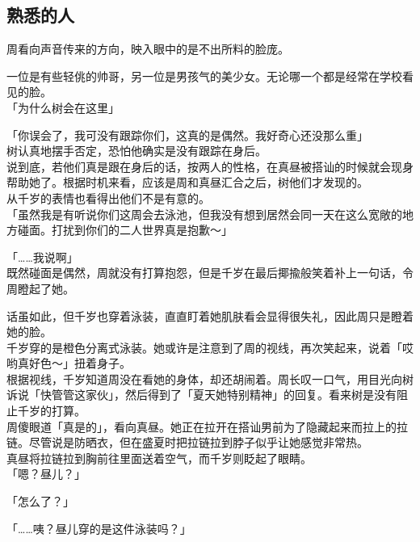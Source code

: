 \subsection{熟悉的人}

周看向声音传来的方向，映入眼中的是不出所料的脸庞。

一位是有些轻佻的帅哥，另一位是男孩气的美少女。无论哪一个都是经常在学校看见的脸。\\

「为什么树会在这里」

「你误会了，我可没有跟踪你们，这真的是偶然。我好奇心还没那么重」\\

树认真地摆手否定，恐怕他确实是没有跟踪在身后。\\

说到底，若他们真是跟在身后的话，按两人的性格，在真昼被搭讪的时候就会现身帮助她了。根据时机来看，应该是周和真昼汇合之后，树他们才发现的。\\

从千岁的表情也看得出他们不是有意的。\\

「虽然我是有听说你们这周会去泳池，但我没有想到居然会同一天在这么宽敞的地方碰面。打扰到你们的二人世界真是抱歉～」

「……我说啊」\\

既然碰面是偶然，周就没有打算抱怨，但是千岁在最后揶揄般笑着补上一句话，令周瞪起了她。

话虽如此，但千岁也穿着泳装，直直盯着她肌肤看会显得很失礼，因此周只是瞪着她的脸。\\

千岁穿的是橙色分离式泳装。她或许是注意到了周的视线，再次笑起来，说着「哎哟真好色～」扭着身子。\\

根据视线，千岁知道周没在看她的身体，却还胡闹着。周长叹一口气，用目光向树诉说「快管管这家伙」，然后得到了「夏天她特别精神」的回复。看来树是没有阻止千岁的打算。\\

周傻眼道「真是的」，看向真昼。她正在拉开在搭讪男前为了隐藏起来而拉上的拉链。尽管说是防晒衣，但在盛夏时把拉链拉到脖子似乎让她感觉非常热。\\

真昼将拉链拉到胸前往里面送着空气，而千岁则眨起了眼睛。\\

「嗯？昼儿？」

「怎么了？」

「……咦？昼儿穿的是这件泳装吗？」

